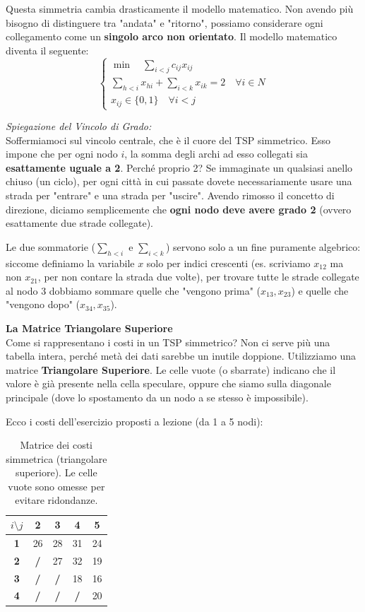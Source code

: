 \documentclass[12pt, a4paper]{article}
\renewcommand{\arraystretch}{1.25}
\begin{document}
	Questa simmetria cambia drasticamente il modello matematico. Non avendo più bisogno di distinguere tra "andata" e "ritorno", possiamo considerare ogni collegamento come un \textbf{singolo arco non orientato}. Il modello matematico diventa il seguente:
	\[
	\begin{cases}
		\min \quad \sum_{i < j} c_{ij} x_{ij} \\[10pt]
		\sum_{h < i} x_{hi} + \sum_{i < k} x_{ik} = 2 \quad \forall i \in N \\[10pt]
		x_{ij} \in \{0, 1\} \quad \forall i < j
	\end{cases}
	\]
	
	\textit{Spiegazione del Vincolo di Grado:}\\
	Soffermiamoci sul vincolo centrale, che è il cuore del TSP simmetrico. Esso impone che per ogni nodo $i$, la somma degli archi ad esso collegati sia \textbf{esattamente uguale a 2}. 
	Perché proprio 2? Se immaginate un qualsiasi anello chiuso (un ciclo), per ogni città in cui passate dovete necessariamente usare una strada per "entrare" e una strada per "uscire". Avendo rimosso il concetto di direzione, diciamo semplicemente che \textbf{ogni nodo deve avere grado 2} (ovvero esattamente due strade collegate).
	
	Le due sommatorie ($\sum_{h < i}$ e $\sum_{i < k}$) servono solo a un fine puramente algebrico: siccome definiamo la variabile $x$ solo per indici crescenti (es. scriviamo $x_{12}$ ma non $x_{21}$, per non contare la strada due volte), per trovare tutte le strade collegate al nodo 3 dobbiamo sommare quelle che "vengono prima" ($x_{13}, x_{23}$) e quelle che "vengono dopo" ($x_{34}, x_{35}$).
	
	\vspace{0.4cm}
	\textbf{La Matrice Triangolare Superiore}\\
	Come si rappresentano i costi in un TSP simmetrico? Non ci serve più una tabella intera, perché metà dei dati sarebbe un inutile doppione. 
	Utilizziamo una matrice \textbf{Triangolare Superiore}. Le celle vuote (o sbarrate) indicano che il valore è già presente nella cella speculare, oppure che siamo sulla diagonale principale (dove lo spostamento da un nodo a se stesso è impossibile).
	
	Ecco i costi dell'esercizio proposti a lezione (da 1 a 5 nodi):
	
	\begin{table}[H]
		\centering
		\renewcommand{\arraystretch}{1.5}
		\begin{tabular}{|c|c|c|c|c|}
			\hline
			\textbf{$i \setminus j$} & \textbf{2} & \textbf{3} & \textbf{4} & \textbf{5} \\ \hline
			\textbf{1} & 26 & 28 & 31 & 24 \\ \hline
			\textbf{2} & \textbf{/} & 27 & 32 & 19 \\ \hline
			\textbf{3} & \textbf{/} & \textbf{/} & 18 & 16 \\ \hline
			\textbf{4} & \textbf{/} & \textbf{/} & \textbf{/} & 20 \\ \hline
		\end{tabular}
		\caption{Matrice dei costi simmetrica (triangolare superiore). Le celle vuote sono omesse per evitare ridondanze.}
	\end{table}
	
\end{document}
